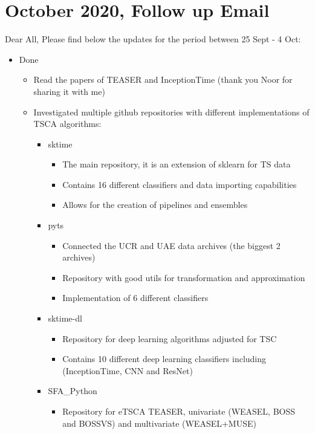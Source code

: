 \documentclass{article}
\begin{document}
\section*{\texorpdfstring{}. October 2020, Follow up Email}
Dear All,\newline
Please find below the updates for the period between 25 Sept - 4 Oct:\newline
\begin{itemize}
	\item Done
		\begin{itemize}
			\item Read the papers of TEASER and InceptionTime (thank you Noor for sharing it with me)
			\item Investigated multiple github repositories with different implementations of TSCA algorithms:
				\begin{itemize}
					\item sktime
						\begin{itemize}
							\item The main repository, it is an extension of sklearn for TS data
							\item Contains 16 different classifiers and data importing capabilities
							\item Allows for the creation of pipelines and ensembles
						\end{itemize}
					\item pyts
						\begin{itemize}
							\item Connected the UCR and UAE data archives (the biggest 2 archives)
							\item Repository with good utils for transformation and approximation
							\item Implementation of 6 different classifiers
						\end{itemize}
					\item sktime-dl
						\begin{itemize}
							\item Repository for deep learning algorithms adjusted for TSC
							\item Contains 10 different deep learning classifiers including (InceptionTime, CNN and ResNet)
						\end{itemize}
					\item SFA\_Python
						\begin{itemize}
							\item Repository for eTSCA TEASER, univariate (WEASEL, BOSS and BOSSVS) and multivariate (WEASEL+MUSE)

\end{itemize}
\end{itemize}
\end{itemize}
\end{itemize}
\end{document}
